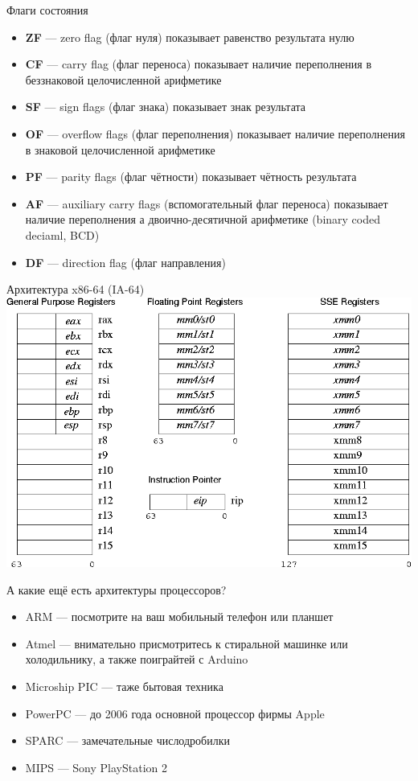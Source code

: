 \documentclass{beamer}
\begin{document}
    \begin{frame}{Флаги состояния}
        \begin{itemize}
            \item {\bf ZF} --- zero flag (флаг нуля) показывает равенство результата нулю
            \item {\bf CF} --- carry flag (флаг переноса) показывает наличие переполнения в беззнаковой целочисленной арифметике
            \item {\bf SF} --- sign flags (флаг знака) показывает знак результата
            \item {\bf OF} --- overflow flags (флаг переполнения) показывает наличие переполнения в знаковой целочисленной арифметике
            \item {\bf PF} --- parity flags (флаг чётности)  показывает чётность результата
            \item {\bf AF} --- auxiliary carry flags (вспомогательный флаг переноса) показывает наличие переполнения а двоично-десятичной арифметике (binary coded deciaml, BCD)
            \item {\bf DF} --- direction flag (флаг направления)
        \end{itemize}
    \end{frame}
    \begin{frame}{Архитектура x86-64 (IA-64)}
        \includegraphics[width=\linewidth]{fig/x86-64.png}
    \end{frame}
    \begin{frame}{А какие ещё есть архитектуры процессоров?}
        \begin{itemize}
            \item ARM --- посмотрите на ваш мобильный телефон или планшет
            \item Atmel --- внимательно присмотритесь к стиральной машинке или холодильнику, а также поиграйтей с Arduino
            \item Microship PIC --- таже бытовая техника
            \item PowerPC --- до 2006 года основной процессор фирмы Apple
            \item SPARC --- замечательные числодробилки
            \item MIPS --- Sony PlayStation 2
        \end{itemize}
    \end{frame}
\end{document}
